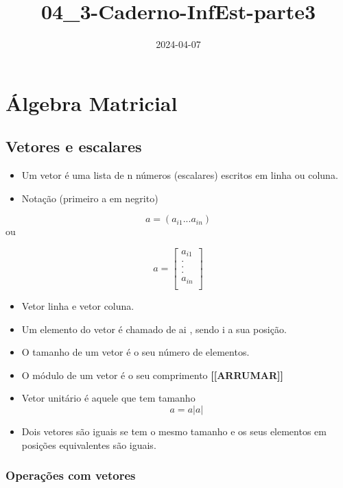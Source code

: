 \documentclass[
]{article}
\title{04\_3-Caderno-InfEst-parte3}
\author{}
\date{\vspace{-2.5em}2024-04-07}
\providecommand{\tightlist}{%
  \setlength{\itemsep}{0pt}\setlength{\parskip}{0pt}}
\begin{document}
\maketitle

\hypertarget{uxe1lgebra-matricial}{%
\section{Álgebra Matricial}\label{uxe1lgebra-matricial}}

\hypertarget{vetores-e-escalares}{%
\subsection{Vetores e escalares}\label{vetores-e-escalares}}

\begin{itemize}
\tightlist
\item
  Um vetor é uma lista de n números (escalares) escritos em linha ou
  coluna.
\item
  Notação (primeiro a em negrito)
\end{itemize}

\[
a = (a_{i1} ... a_{in})
\] ou

\[
a = \begin{bmatrix}
a_{i1}\\
.\\
.\\
.\\
a_{in}\\
\end{bmatrix}
\]

\begin{itemize}
\item
  Vetor linha e vetor coluna.
\item
  Um elemento do vetor é chamado de ai , sendo i a sua posição.
\item
  O tamanho de um vetor é o seu número de elementos.
\item
  O módulo de um vetor é o seu comprimento \textbf{{[}{[}ARRUMAR{]}{]}}
\item
  Vetor unitário é aquele que tem tamanho \[ a = a |a|\]
\item
  Dois vetores são iguais se tem o mesmo tamanho e os seus elementos em
  posições equivalentes são iguais.
\end{itemize}

\hypertarget{operauxe7uxf5es-com-vetores}{%
\subsubsection{Operações com
vetores}\label{operauxe7uxf5es-com-vetores}}
\end{document}
